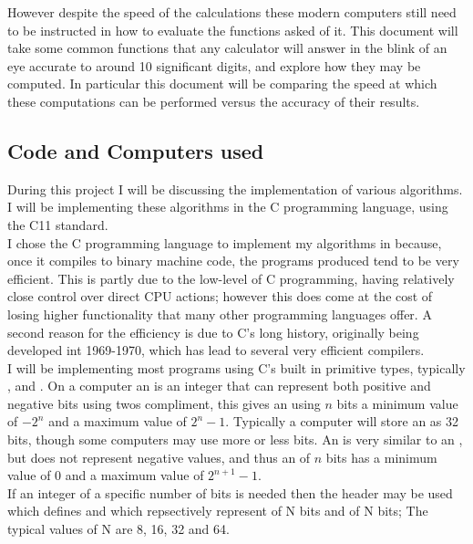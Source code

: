However despite the speed of the calculations these modern computers still need to be instructed in how to evaluate the functions asked of it. This document will take some common functions that any calculator will answer in the blink of an eye accurate to around 10 significant digits, and explore how they may be computed. In particular this document will be comparing the speed at which these computations can be performed versus the accuracy of their results.\\

\subsection{Code and Computers used}
\label{SUB_"Code and Computers used}
During this project I will be discussing the implementation of various algorithms. I will be implementing these algorithms in the C programming language, using the C11 standard.\\

I chose the C programming language to implement my algorithms in because, once it compiles to binary machine code, the programs produced tend to be very efficient. This is partly due to the low-level of C programming, having relatively close control over direct CPU actions; however this does come at the cost of losing higher functionality that many other programming languages offer. A second reason for the efficiency is due to C's long history, originally being developed int 1969-1970, which has lead to several very efficient compilers.\\

I will be implementing most programs using C's built in primitive types, typically ,  and . On a computer an  is an integer that can represent both positive and negative bits using twos compliment, this gives an  using \(n\) bits a minimum value of \(-2^n\) and a maximum value of \(2^n-1\). Typically a computer will store an  as 32 bits, though some computers may use more or less bits. An  is very similar to an , but does not represent negative values, and thus an  of \(n\) bits has a minimum value of \(0\) and a maximum value of \(2^{n+1}-1\).\\

If an integer of a specific number of bits is needed then the header  may be used which defines  and  which repsectively represent  of N bits and  of N bits; The typical values of N are 8, 16, 32 and 64.\\

